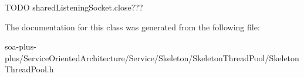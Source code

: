 TODO sharedListeningSocket.close??? 



The documentation for this class was generated from the following file:\begin{DoxyCompactItemize}
\item 
soa-\/plus-\/plus/ServiceOrientedArchitecture/Service/Skeleton/SkeletonThreadPool/SkeletonThreadPool.h\end{DoxyCompactItemize}
